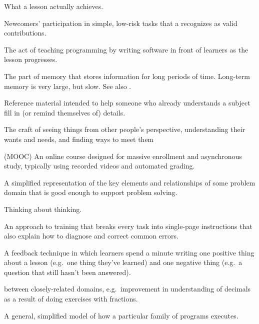 \begin{description}
 What a lesson actually achieves.

 Newcomers' participation in simple, low-risk tasks that a
 recognizes as valid contributions.

 The act of teaching programming by writing
software in front of learners as the lesson progresses.

 The part of memory that stores
information for long periods of time. Long-term memory is very large, but
slow. See also .

 Reference material intended to help someone who
already understands a subject fill in (or remind themselves of) details.

 The craft of seeing things from other people's
perspective, understanding their wants and needs, and finding ways to meet them

 (MOOC) An online course designed
for massive enrollment and asynchronous study, typically using recorded videos
and automated grading.

 A simplified representation of the key
elements and relationships of some problem domain that is good enough to support
problem solving.

 Thinking about thinking.

 An approach to training that breaks
every task into single-page instructions that also explain how to diagnose and
correct common errors.

 A feedback technique in which learners
spend a minute writing one positive thing about a lesson (e.g.\ one thing
they've learned) and one negative thing (e.g.\ a question that still hasn't been
answered).

 
between closely-related domains, e.g.\ improvement in understanding of decimals
as a result of doing exercises with fractions.

 A general, simplified model of how
a particular family of programs executes.


\end{description}
